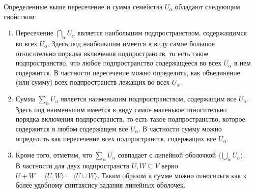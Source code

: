 Определенные выше пересечение и сумма семейства $U_\alpha$ обладают следующим свойством:
\begin{enumerate}
\item Пересечение $\bigcap_{\alpha} U_\alpha$ является наибольшим подпространством, содержащимся во всех $U_\alpha$.
Здесь под наибольшим имеется в виду самое большое относительно порядка включения подпространств, то есть такое подпространство, что любое подпространство содержащееся во всех $U_\alpha$ в нем содержится.
В частности пересечение можно определить, как объединение (или сумму) всех подпространств лежащих во всех $U_\alpha$.

\item Сумма $\sum_\alpha U_\alpha$ является наименьшим подпространством, содержащим все $U_\alpha$.
Здесь под наименьшим имеется в виду самое маленькое относительно порядка включения подпространств, то есть такое подпространство, которое содержится в любом содержащем все $U_\alpha$.
В частности сумму можно определить как пересечение всех подпространств, содержащих все $U_\alpha$.

\item Кроме того, отметим, что $\sum_{\alpha} U_\alpha$ совпадает с линейной оболочкой $\langle \bigcup_\alpha U_\alpha \rangle$.
В частности для двух подпространств $U,W\subseteq V$ верно $U + W = \langle U, W\rangle = \langle U\cup W\rangle$.
Таким образом к сумме можно относиться как к более удобному синтаксису задания линейных оболочек.
\end{enumerate}
